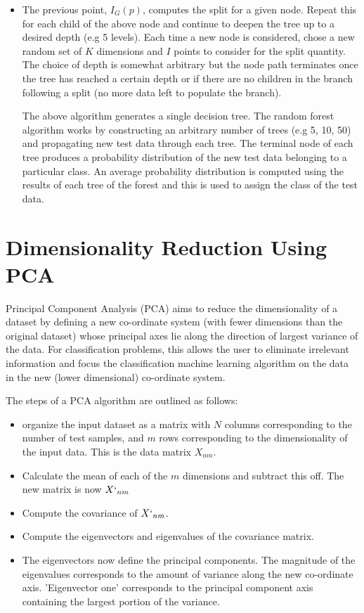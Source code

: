 \documentclass[10pt]{article}
\begin{document}
\begin{itemize}
\item The previous point, $I_G (p)$, computes the split for a given node. Repeat this for each child of the above node and continue to deepen the tree up to a desired depth (e.g 5 levels). Each time a new node is considered, chose a new random set of $K$ dimensions and $I$ points to consider for the split quantity. The choice of depth is somewhat arbitrary but the node path terminates once the tree has reached a certain depth or if there are no children in the branch following a split (no more data left to populate the branch).

The above algorithm generates a single decision tree. The random forest algorithm works by constructing an arbitrary number of trees (e.g 5, 10, 50) and propagating new test data through each tree. The terminal node of each tree produces a probability distribution of the new test data belonging to a particular class. An average probability distribution is computed using the results of each tree of the forest and this is used to assign the class of the test data.

\end{itemize}






\section{Dimensionality Reduction Using PCA}
Principal Component Analysis (PCA) aims to reduce the dimensionality of a dataset by defining a new co-ordinate system (with fewer dimensions than the original dataset) whose principal axes lie along the direction of largest variance of the data. For classification problems, this allows the user to eliminate irrelevant information and focus the classification machine learning algorithm on the data in the new (lower dimensional) co-ordinate system.

The steps of a PCA algorithm are outlined as follows:
\begin{itemize}
\item organize the input dataset as a matrix with $N$ columns corresponding to the number of test samples, and $m$ rows corresponding to the dimensionality of the input data. This is the data matrix $X_{nm}$.

\item Calculate the mean of each of the $m$ dimensions and subtract this off. The new matrix is now $X`_{nm}$

\item Compute the covariance of $X`_{nm}$.

\item Compute the eigenvectors and eigenvalues of the covariance matrix.

\item The eigenvectors now define the principal components. The magnitude of the eigenvalues corresponds to the amount of variance along the new co-ordinate axis. 'Eigenvector one' corresponds to the principal component axis containing the largest portion of the variance. 

\end{itemize}
\end{document}
